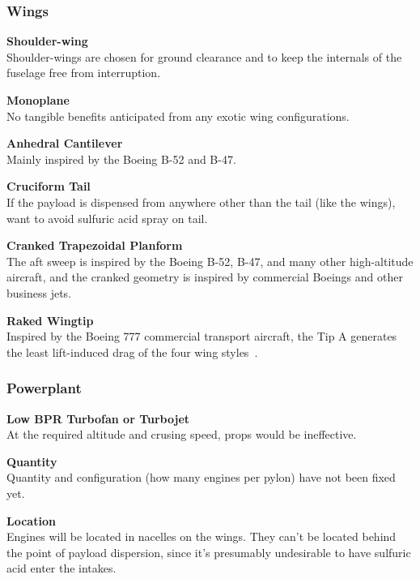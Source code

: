 \documentclass[12pt]{article}
\newcounter{enumine}
\begin{document}
\subsubsection{Wings}
\begin{compactenum}
\setcounter{enumi}{\value{enumine}}
	\item \textbf{Shoulder-wing} \\ Shoulder-wings are chosen for ground clearance and to keep the internals of the fuselage free from interruption.
	\item \textbf{Monoplane} \\ No tangible benefits anticipated from any exotic wing configurations.
	\item \textbf{Anhedral Cantilever} \\ Mainly inspired by the Boeing B-52 and B-47.
	\item \textbf{Cruciform Tail} \\ If the payload is dispensed from anywhere other than the tail (like the wings), want to avoid sulfuric acid spray on tail.
	\item \textbf{Cranked Trapezoidal Planform} \\ The aft sweep is inspired by the Boeing B-52, B-47, and many other high-altitude aircraft, and the cranked geometry is inspired by commercial Boeings and other business jets.
	\item \textbf{Raked Wingtip} \\ Inspired by the Boeing 777 commercial transport aircraft, the Tip A generates the least lift-induced drag of the four wing styles~\cite{textbook}.
\setcounter{enumine}{\value{enumi}}
\end{compactenum}
\subsubsection{Powerplant}
\begin{compactenum}
\setcounter{enumi}{\value{enumine}}
	\item \textbf{Low BPR Turbofan or Turbojet} \\ At the required altitude and crusing speed, props would be ineffective.
	\item \textbf{Quantity} \\ Quantity and configuration (how many engines per pylon) have not been fixed yet.
	\item \textbf{Location} \\ Engines will be located in nacelles on the wings. They can't be located behind the point of payload dispersion, since it's presumably undesirable to have sulfuric acid enter the intakes.
\end{compactenum}
\end{document}
